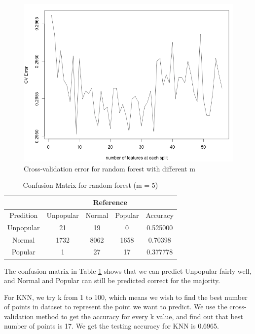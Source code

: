 \documentclass[12pt]{article}
\begin{document}
    \begin{figure}[h]
        \centering
        \includegraphics[width=0.8\linewidth]{randomforest_oob.png}
        \caption{Cross-validation error for random forest with different m}
    \end{figure}
    
    \begin{table}[h]
        \centering
        \caption{Confusion Matrix for random forest (m = 5)}
        \begin{tabular}{ c | c | c | c | c }
            \hline\hline
            {} & \multicolumn{4}{c}{Reference} \\
            \hline
            Predition & Unpopular & Normal & Popular & Accuracy\\
            \hline
            Unpopular & 21 & 19 & 0 & 0.525000\\
            \hline
            Normal & 1732 & 8062 & 1658 & 0.70398\\
            \hline
            Popular & 1 & 27 & 17 & 0.377778\\
            \hline\hline
        \end{tabular}
        \label{table:rf}
    \end{table}

The confusion matrix in Table \ref{table:rf} shows that we can predict Unpopular fairly well, and Normal and Popular can still be predicted correct for the majority.

For KNN, we try k from 1 to 100, which means we wish to find the best number of points in dataset to represent the point we want to predict. We use the cross-validation method to get the accuracy for every k value, and find out that best number of points is 17. We get the testing accuracy for KNN is 0.6965.
\end{document}
